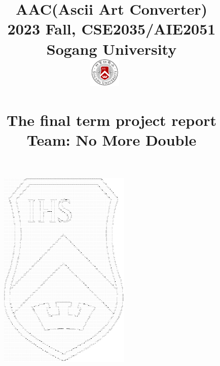 \documentclass[conference]{IEEEtran}
\begin{document}
\newcommand{\libpng}{\textbf{libpng}}
\newcommand{\Eigen}{\textbf{Eigen}}

\newcommand{\eg}{\textbf{eg}}
\newcommand{\egExceptions}{\textbf{egExceptions}}
\newcommand{\egGeometry}{\textbf{egGeometry}}
\newcommand{\egLoader}{\textbf{egLoader}}
\newcommand{\egMath}{\textbf{egMath}}
\newcommand{\egMethods}{\textbf{egMethods}}
\newcommand{\egOperators}{\textbf{egOperators}}
\newcommand{\egProcessing}{\textbf{egProcessing}}
\newcommand{\egTrace}{\textbf{egTrace}}
\newcommand{\egTypes}{\textbf{egTypes}}

\newcommand{\imgascii}{\textbf{img2ascii}}
\newcommand{\tone}{\textbf{tone}}
\newcommand{\structure}{\textbf{structure}}

\title{AAC(Ascii Art Converter)\\ \vspace{1em}
{\large 2023 Fall, CSE2035/AIE2051 \\ Sogang University \\} \vspace{0.5em}
{\includegraphics[width=1.5cm]{./sogang_university_logo.png}}
{\large ~\\~}
{\large \\ The final term project report \\ \vspace{-1em}Team: No More Double}}
\author{
\and
{}
}

\begin{figure}
    \hspace{2.25em}
    \includegraphics[width=0.75\paperwidth]{ascii_logo_1.pdf}
    \end{figure}
\end{document}
